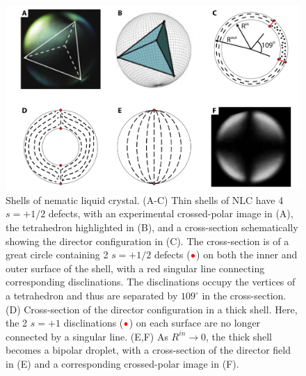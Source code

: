 \begin{figure}
  \centering
  \includegraphics{figures/C1/Ch1-Figs_Shells.png}
  \caption{Shells of nematic liquid crystal.
  (A-C) Thin shells of NLC have 4 $s = +1/2$ defects, with an experimental crossed-polar image in (A), the tetrahedron highlighted in (B), and a cross-section schematically showing the director configuration in (C).
  The cross-section is of a great circle containing 2 $s = +1/2$ defects (${\color{red} \bullet}$) on both the inner and outer surface of the shell, with a red singular line connecting corresponding disclinations.
  The disclinations occupy the vertices of a tetrahedron and thus are separated by $109^{\circ}$ in the cross-section.
  (D) Cross-section of the director configuration in a thick shell. Here, the 2 $s = +1$ disclinations (${\color{red} \bullet}$) on each surface are no longer connected by a singular line.
  (E,F) As $R^{in}\rightarrow 0$, the thick shell becomes a bipolar droplet, with a cross-section of the director field in (E) and a corresponding crossed-polar image in (F).}\label{f:1-Shells}
\end{figure}

